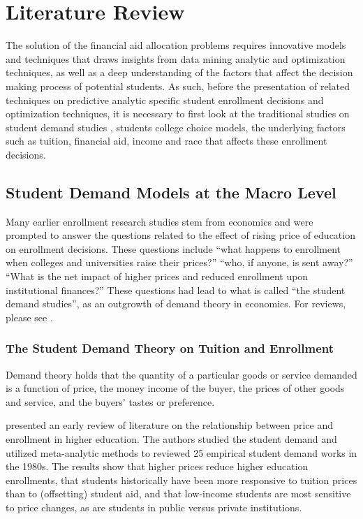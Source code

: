 \documentclass[12pt,english]{report}
\begin{document}
\chapter{Literature Review}
The solution of the financial aid allocation problems requires innovative
models and techniques that draws insights from data mining analytic and
optimization techniques, as well as a deep understanding of the factors that
affect the decision making process of potential students.  As such, before the
presentation of related techniques on predictive  analytic specific student
enrollment decisions and  optimization techniques, it is necessary to first
look at the traditional studies on student demand studies , students college
choice models, the underlying factors such as tuition, financial aid, income
and race that affects these enrollment decisions.

\section{Student Demand Models at the Macro Level }
Many earlier enrollment research studies stem from economics and were prompted
to answer the questions related to the effect of rising price of education on
enrollment decisions. These questions include  ``what happens to enrollment
when colleges and universities raise their prices?''  ``who, if anyone, is sent
away?''  ``What is the net impact of higher prices and reduced enrollment upon
institutional finances?''  These questions had lead to what is called ``the
student demand studies'', as an outgrowth of demand theory in economics.   For
reviews, please see \citep{Leslie1987,  Leslie1988, Heller1997, Ehrenberg2004,
Crouse2015}.

\subsection{The Student Demand Theory on Tuition and Enrollment}
Demand theory holds that the quantity of a particular goods or service demanded
is a function of price, the money income of the buyer, the prices of other
goods and service, and the buyers' tastes or preference.

\citet{Leslie1987} presented an early review of literature on the relationship
between price and enrollment in higher education. The authors studied the
student demand and utilized meta-analytic methods to reviewed 25 empirical
student demand works in the 1980s. The results show that higher prices reduce
higher education enrollments, that students historically have been more
responsive to tuition prices than to (offsetting) student aid, and that
low-income students are most sensitive to price changes, as are students in
public versus private institutions.
\end{document}
